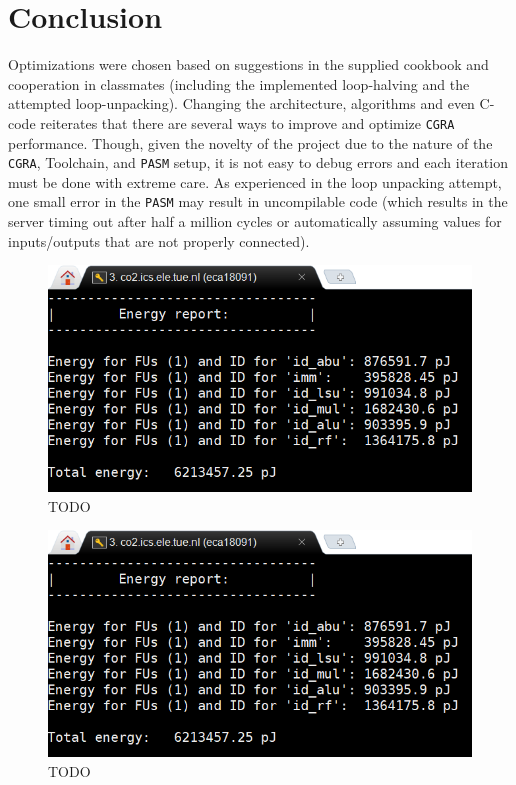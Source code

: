 \documentclass[letterpaper, 10 pt, conference]{ieeeconf}  %
\begin{document}
\section{Conclusion}

Optimizations were chosen based on suggestions in the supplied cookbook and cooperation in classmates (including the implemented loop-halving and the attempted loop-unpacking). Changing the architecture, algorithms and even C-code reiterates that there are several ways to improve and optimize \texttt{CGRA} performance. Though, given the novelty of the project due to the nature of the \texttt{CGRA}, Toolchain, and \texttt{PASM} setup, it is not easy to debug errors and each iteration must be done with extreme care. As experienced in the loop unpacking attempt, one small error in the \texttt{PASM} may result in uncompilable code (which results in the server timing out after half a million cycles or automatically assuming values for inputs/outputs that are not properly connected).

\begin{figure}[h]
\begin{center}
\includegraphics[scale=0.35]{images/O101.png}
\caption{TODO}
\label{fig:TODO}
\end{center}
\end{figure}

\begin{figure}[h]
\begin{center}
\includegraphics[scale=0.35]{images/O101.png}
\caption{TODO}
\label{fig:TODO}
\end{center}
\end{figure}
\end{document}
